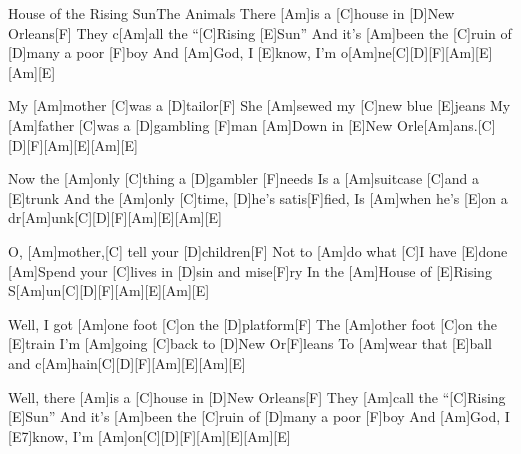 \documentclass[../main.tex]{subfiles}
\begin{document}
\begin{song}{House of the Rising Sun}{The Animals}{}
There [Am]is a [C]house in [D]New Orleans[F]{\hh}
They c[Am]all the ``[C]Rising [E]Sun''
And it's [Am]been the [C]ruin of [D]many a poor [F]boy
And [Am]God, I [E]know, I'm o[Am]ne[C]{\hh}[D]{\hh}[F]{\hh}[Am]{\hh}[E]{\hh}[Am]{\hh}[E]{\hh}

My [Am]mother [C]was a [D]tailor[F]{\hh}
She [Am]sewed my [C]new blue [E]jeans
My [Am]father [C]was a [D]gambling [F]man
[Am]Down in [E]New Orle[Am]ans.[C]{\hh}[D]{\hh}[F]{\hh}[Am]{\hh}[E]{\hh}[Am]{\hh}[E]{\hh}

Now the [Am]only [C]thing a [D]gambler [F]needs
Is a [Am]suitcase [C]and a [E]trunk
And the [Am]only [C]time, [D]he's satis[F]fied,
Is [Am]when he's [E]on a dr[Am]unk[C]{\hh}[D]{\hh}[F]{\hh}[Am]{\hh}[E]{\hh}[Am]{\hh}[E]{\hh}

O, [Am]mother,[C] tell your [D]children[F]{\hh}
Not to [Am]do what [C]I have [E]done
[Am]Spend your [C]lives in [D]sin and mise[F]ry
In the [Am]House of [E]Rising S[Am]un[C]{\hh}[D]{\hh}[F]{\hh}[Am]{\hh}[E]{\hh}[Am]{\hh}[E]{\hh}

Well, I got [Am]one foot [C]on the [D]platform[F]{\hh}
The [Am]other foot [C]on the [E]train
I'm [Am]going [C]back to [D]New Or[F]leans
To [Am]wear that [E]ball and c[Am]hain[C]{\hh}[D]{\hh}[F]{\hh}[Am]{\hh}[E]{\hh}[Am]{\hh}[E]{\hh}

Well, there [Am]is a [C]house in [D]New Orleans[F]{\hh}
They [Am]call the ``[C]Rising [E]Sun''
And it's [Am]been the [C]ruin of [D]many a poor [F]boy
And [Am]God, I [E7]know, I'm [Am]on[C]{\hh}[D]{\hh}[F]{\hh}[Am]{\hh}[E]{\hh}[Am]{\hh}[E]{\hh}
\end{song}
\end{document}
